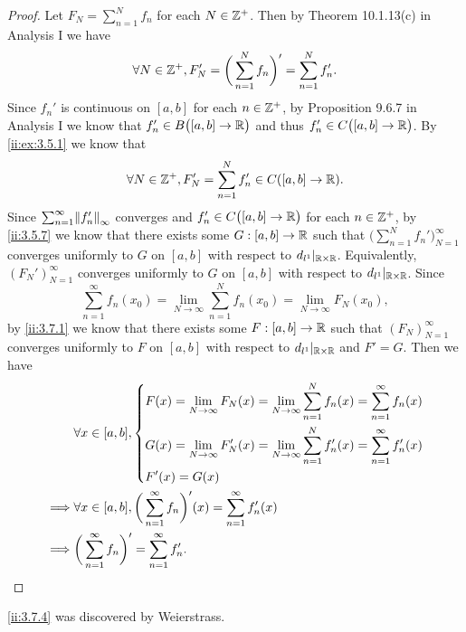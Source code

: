 \begin{proof}
  Let \(F_N = \sum_{n = 1}^N f_n\) for each \(N \in \mathbb{Z}^+\).
  Then by Theorem 10.1.13(c) in Analysis I we have
  \[
    \forall N \in \mathbb{Z}^+, F_N' = \bigg(\sum_{n = 1}^N f_n\bigg)' = \sum_{n = 1}^N f_n'.
  \]
  Since \(f_n'\) is continuous on \([a, b]\) for each \(n \in \mathbb{Z}^+\), by Proposition 9.6.7 in Analysis I we know that \(f_n' \in B\big([a, b] \to \mathbb{R}\big)\) and thus \(f_n' \in C\big([a, b] \to \mathbb{R}\big)\).
  By \cref{ii:ex:3.5.1} we know that
  \[
    \forall N \in \mathbb{Z}^+, F_N' = \sum_{n = 1}^N f_n' \in C([a, b] \to \mathbb{R}).
  \]
  Since \(\sum_{n = 1}^\infty \norm*{f_n'}_\infty\) converges and \(f_n' \in C\big([a, b] \to \mathbb{R}\big)\) for each \(n \in \mathbb{Z}^+\), by \cref{ii:3.5.7} we know that there exists some \(G : [a, b] \to \mathbb{R}\) such that \(\big(\sum_{n = 1}^N f_n'\big)_{N = 1}^\infty\) converges uniformly to \(G\) on \([a, b]\) with respect to \(d_{l^1}|_{\mathbb{R} \times \mathbb{R}}\).
  Equivalently, \((F_N')_{N = 1}^\infty\) converges uniformly to \(G\) on \([a, b]\) with respect to \(d_{l^1}|_{\mathbb{R} \times \mathbb{R}}\).
  Since
  \[
    \sum_{n = 1}^\infty f_n(x_0) = \lim_{N \to \infty} \sum_{n = 1}^N f_n(x_0) = \lim_{N \to \infty} F_N(x_0),
  \]
  by \cref{ii:3.7.1} we know that there exists some \(F : [a, b] \to \mathbb{R}\) such that \((F_N)_{N = 1}^\infty\) converges uniformly to \(F\) on \([a, b]\) with respect to \(d_{l^1}|_{\mathbb{R} \times \mathbb{R}}\) and \(F' = G\).
  Then we have
  \begin{align*}
             & \forall x \in [a, b], \begin{dcases}
                                       F(x) = \lim_{N \to \infty} F_N(x) = \lim_{N \to \infty} \sum_{n = 1}^N f_n(x) = \sum_{n = 1}^\infty f_n(x)    \\
                                       G(x) = \lim_{N \to \infty} F_N'(x) = \lim_{N \to \infty} \sum_{n = 1}^N f_n'(x) = \sum_{n = 1}^\infty f_n'(x) \\
                                       F'(x) = G(x)
                                     \end{dcases} \\
    \implies & \forall x \in [a, b], \bigg(\sum_{n = 1}^\infty f_n\bigg)'(x) = \sum_{n = 1}^\infty f_n'(x)                                         \\
    \implies & \bigg(\sum_{n = 1}^\infty f_n\bigg)' = \sum_{n = 1}^\infty f_n'.
  \end{align*}
\end{proof}

\begin{note}
  \cref{ii:3.7.4} was discovered by Weierstrass.
\end{note}

